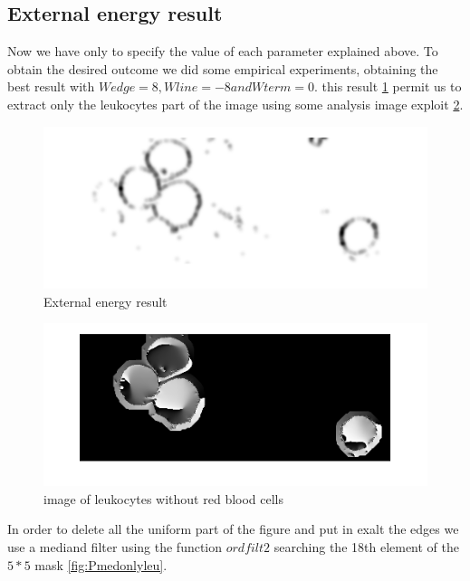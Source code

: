 \subsection{External energy result}
Now we have only to specify the value of each parameter explained above.
To obtain the desired outcome we did some empirical experiments, obtaining the best result with $ Wedge=8, Wline=-8 and Wterm=0$. this result \ref{fig:Eextforce} permit us to extract only the leukocytes part of the image using some analysis image exploit \ref{fig:onlyleu}.
\begin{figure}
	\begin{center}
		\centering
		\includegraphics[scale=0.5]{img/Eext.png}
		\caption{External energy result}
		\label{fig:Eextforce}
	\end{center}
\end{figure}

\begin{figure}
	\begin{center}
		\centering
		\includegraphics[scale=0.5]{img/onlyleuco.png}
		\caption{image of leukocytes without red blood cells}
		\label{fig:onlyleu}
	\end{center}
\end{figure}
In order to delete all the uniform part of the figure and put in exalt the edges we use a mediand filter using the function $ordfilt2$ searching the 18th element of the $5 * 5$ mask \ref{fig:Pmedonlyleu}.

